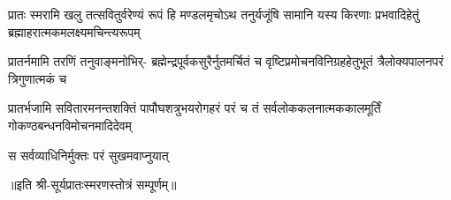 

\fourlineindentedshloka
{प्रातः स्मरामि खलु तत्सवितुर्वरेण्यं}
{रूपं हि मण्डलमृचोऽथ तनुर्यजूंषि}
{सामानि यस्य किरणाः प्रभवादिहेतुं}
{ब्रह्माहरात्मकमलक्ष्यमचिन्त्यरूपम्}

\fourlineindentedshloka
{प्रातर्नमामि तरणिं तनुवाङ्मनोभिर्-}
{ब्रह्मेन्द्रपूर्वकसुरैर्नुतमर्चितं च}
{वृष्टिप्रमोचनविनिग्रहहेतुभूतं}
{त्रैलोक्यपालनपरं त्रिगुणात्मकं च}

\fourlineindentedshloka
{प्रातर्भजामि सवितारमनन्तशक्तिं}
{पापौघशत्रुभयरोगहरं परं च}
{तं सर्वलोककलनात्मककालमूर्तिं}
{गोकण्ठबन्धनविमोचनमादिदेवम्}

{स सर्वव्याधिनिर्मुक्तः परं सुखमवाप्नुयात्}

॥इति श्री-सूर्यप्रातःस्मरणस्तोत्रं सम्पूर्णम्॥